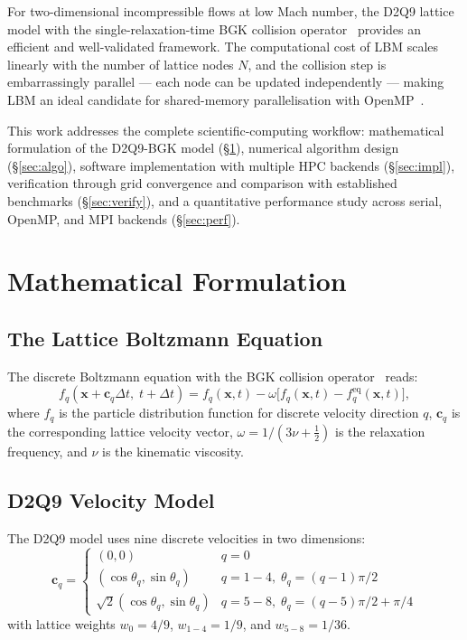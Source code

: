 \documentclass[journal]{IEEEtran}
\begin{document}
For two-dimensional incompressible flows at low Mach number, the D2Q9
lattice model with the single-relaxation-time BGK collision
operator~\cite{bgk1954} provides an efficient and well-validated
framework.  The computational cost of LBM scales linearly with the
number of lattice nodes $N$, and the collision step is embarrassingly
parallel --- each node can be updated independently --- making LBM
an ideal candidate for shared-memory parallelisation with
OpenMP~\cite{openmp2018}.

This work addresses the complete scientific-computing workflow:
mathematical formulation of the D2Q9-BGK model (\S\ref{sec:math}),
numerical algorithm design (\S\ref{sec:algo}), software implementation
with multiple HPC backends (\S\ref{sec:impl}), verification through
grid convergence and comparison with established benchmarks
(\S\ref{sec:verify}), and a quantitative performance study across
serial, OpenMP, and MPI backends (\S\ref{sec:perf}).

\section{Mathematical Formulation}
\label{sec:math}

\subsection{The Lattice Boltzmann Equation}
The discrete Boltzmann equation with the BGK collision
operator~\cite{bgk1954} reads:
\begin{equation}
  f_q(\mathbf{x} + \mathbf{c}_q \Delta t,\; t + \Delta t)
  = f_q(\mathbf{x}, t)
  - \omega\bigl[f_q(\mathbf{x}, t) - f_q^{\mathrm{eq}}(\mathbf{x}, t)\bigr],
  \label{eq:lbe}
\end{equation}
where $f_q$ is the particle distribution function for discrete velocity
direction $q$, $\mathbf{c}_q$ is the corresponding lattice velocity
vector, $\omega = 1/(3\nu + \tfrac{1}{2})$ is the relaxation frequency,
and $\nu$ is the kinematic viscosity.

\subsection{D2Q9 Velocity Model}
The D2Q9 model uses nine discrete velocities in two dimensions:
\begin{equation}
  \mathbf{c}_q = \begin{cases}
    (0,0) & q = 0 \\
    (\cos\theta_q, \sin\theta_q) & q = 1{-}4,\; \theta_q = (q{-}1)\pi/2 \\
    \sqrt{2}(\cos\theta_q, \sin\theta_q) & q = 5{-}8,\; \theta_q = (q{-}5)\pi/2 + \pi/4
  \end{cases}
\end{equation}
with lattice weights $w_0 = 4/9$, $w_{1-4} = 1/9$, and
$w_{5-8} = 1/36$.
\end{document}
